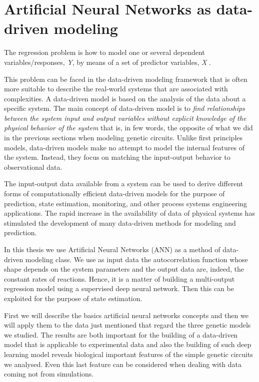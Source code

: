 \documentclass[12pt,a4paper]{report}
\begin{document}
\chapter{Artificial Neural Networks as data-driven modeling}
The regression problem is how to model one or several dependent variables/responses, \emph{Y}, by means of a set of predictor variables, \emph{X} \cite{datadrivenmodeling}. 

This problem can be faced in the data-driven modeling framework that is often more suitable to describe the real-world systems that are associated with complexities. A data-driven model is based on the analysis of the data about a specific system. The main concept of data-driven model is to \emph{find relationships between the system input and output variables without explicit knowledge of the physical behavior of the system} that is, in few words, the opposite of what we did in the previous sections when modeling genetic circuits. Unlike first principles models, data-driven models make no attempt to model the internal features of the system. Instead, they focus on matching the input-output behavior to observational data. 

The input-output data available from a system can be used to derive different forms of computationally efficient data-driven models for the purpose of prediction, state estimation, monitoring, and other process systems engineering applications. The rapid increase in the availability of data of physical systems has stimulated the development of many data-driven methods for modeling and prediction. 

In this thesis we use Artificial Neural Networks (ANN) as a method of data-driven modeling class. We use as input data the autocorrelation function whose shape depends on the system parameters and the output data are, indeed, the constant rates of reactions. Hence, it is a matter of building a multi-output regression model using a supervised deep neural network. Then this can be exploited for the purpose of state estimation.

First we will describe the basics artificial neural networks concepts and then we will apply them to the data just mentioned that regard the three genetic models we studied. The results are both important for the building of a data-driven model that is applicable to experimental data and also the building of such deep learning model reveals biological important features of the simple genetic circuits we analysed. Even this last feature can be considered when dealing with data coming not from simulations. 
\end{document}
